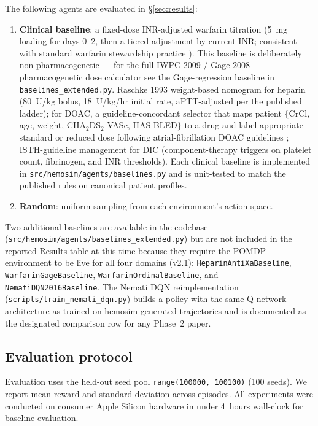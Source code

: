 \documentclass[11pt]{article}
\begin{document}
The following agents are evaluated in \S\ref{sec:results}:
\begin{enumerate}
  \item \textbf{Clinical baseline}: a fixed-dose INR-adjusted warfarin titration (5~mg loading for days 0--2, then a tiered adjustment by current INR; consistent with standard warfarin stewardship practice \citep{holbrook2012}). This baseline is deliberately non-pharmacogenetic — for the full IWPC 2009 / Gage 2008 pharmacogenetic dose calculator see the Gage-regression baseline in \texttt{baselines\_extended.py}. Raschke 1993 weight-based nomogram for heparin \citep{raschke1993} (80~U/kg bolus, 18~U/kg/hr initial rate, aPTT-adjusted per the published ladder); for DOAC, a guideline-concordant selector that maps patient $\{$CrCl, age, weight, CHA$_2$DS$_2$-VASc, HAS-BLED$\}$ to a drug and label-appropriate standard or reduced dose following atrial-fibrillation DOAC guidelines \citep{lip2010,pisters2010}; ISTH-guideline management for DIC \citep{levi2009} (component-therapy triggers on platelet count, fibrinogen, and INR thresholds). Each clinical baseline is implemented in \texttt{src/hemosim/agents/baselines.py} and is unit-tested to match the published rules on canonical patient profiles.
  \item \textbf{Random}: uniform sampling from each environment's action space.
\end{enumerate}

Two additional baselines are available in the codebase (\texttt{src/hemosim/agents/baselines\_extended.py}) but are not included in the reported Results table at this time because they require the POMDP environment to be live for all four domains (v2.1): \texttt{HeparinAntiXaBaseline}, \texttt{WarfarinGageBaseline}, \texttt{WarfarinOrdinalBaseline}, and \texttt{NematiDQN2016Baseline}. The Nemati DQN reimplementation (\texttt{scripts/train\_nemati\_dqn.py}) builds a policy with the same Q-network architecture as \citet{nemati2016} trained on hemosim-generated trajectories and is documented as the designated comparison row for any Phase~2 paper.

\subsection{Evaluation protocol}

Evaluation uses the held-out seed pool \texttt{range(100000, 100100)} (100 seeds). We report mean reward and standard deviation across episodes. All experiments were conducted on consumer Apple Silicon hardware in under 4~hours wall-clock for baseline evaluation.
\end{document}
